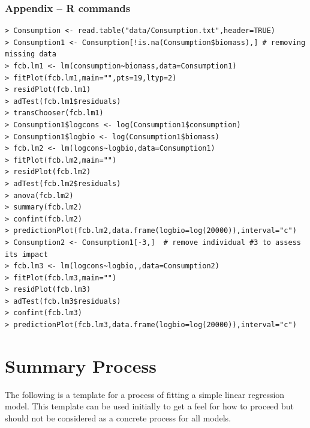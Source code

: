 \documentclass[10pt,openany]{book}\usepackage[]{graphicx}\usepackage[]{color}
\begin{document}
\vspace{-24pt}
\subsubsection*{Appendix -- R commands}
\vspace{-18pt}
\begin{Verbatim}[formatcom=\color{red},xleftmargin=5mm,commandchars=\\\{\}]
> Consumption <- read.table("data/Consumption.txt",header=TRUE)
> Consumption1 <- Consumption[!is.na(Consumption$biomass),] # removing missing data
> fcb.lm1 <- lm(consumption~biomass,data=Consumption1)
> fitPlot(fcb.lm1,main="",pts=19,ltyp=2)
> residPlot(fcb.lm1)
> adTest(fcb.lm1$residuals)
> transChooser(fcb.lm1)
> Consumption1$logcons <- log(Consumption1$consumption)
> Consumption1$logbio <- log(Consumption1$biomass)
> fcb.lm2 <- lm(logcons~logbio,data=Consumption1)
> fitPlot(fcb.lm2,main="")
> residPlot(fcb.lm2)
> adTest(fcb.lm2$residuals)
> anova(fcb.lm2)
> summary(fcb.lm2)
> confint(fcb.lm2)
> predictionPlot(fcb.lm2,data.frame(logbio=log(20000)),interval="c")
> Consumption2 <- Consumption1[-3,]  # remove individual #3 to assess its impact
> fcb.lm3 <- lm(logcons~logbio,,data=Consumption2)
> fitPlot(fcb.lm3,main="")
> residPlot(fcb.lm3)
> adTest(fcb.lm3$residuals)
> confint(fcb.lm3)
> predictionPlot(fcb.lm3,data.frame(logbio=log(20000)),interval="c")
\end{Verbatim}

\clearpage
\section{Summary Process}
The following is a template for a process of fitting a simple linear regression model.  This template can be used initially to get a feel for how to proceed but should not be considered as a concrete process for all models.
\end{document}
